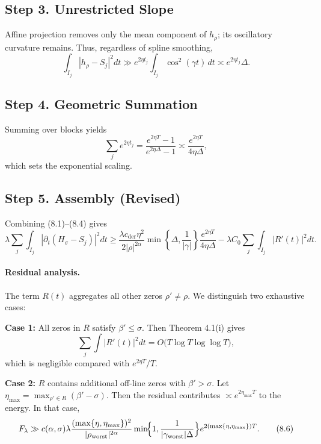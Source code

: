 \subsection{Step 3.  Unrestricted Slope}

Affine projection removes only the mean component of $h_\rho$; its
oscillatory curvature remains.  
Thus, regardless of spline smoothing,
\[
\int_{I_j}\!|h_\rho-S_j|^2dt
   \gg e^{2\eta t_j}\!\int_{I_j}\!\cos^2(\gamma t)\,dt
   \asymp e^{2\eta t_j}\Delta.
\tag{8.3}
\]

\subsection{Step 4.  Geometric Summation}

Summing over blocks yields
\[
\sum_j e^{2\eta t_j}
  = \frac{e^{2\eta T}-1}{e^{2\eta\Delta}-1}
  \asymp \frac{e^{2\eta T}}{4\eta\Delta},
\tag{8.4}
\]
which sets the exponential scaling.

\subsection{Step 5.  Assembly (Revised)}

Combining (8.1)–(8.4) gives
\[
\lambda\sum_j\!\int_{I_j}\!|\partial_t(H_\sigma-S_j)|^2dt
 \ge
\frac{\lambda c_{\mathrm{der}}\eta^2}{2|\rho|^{2\alpha}}
 \min\!\left\{\!\Delta,\frac{1}{|\gamma|}\!\right\}
 \frac{e^{2\eta T}}{4\eta\Delta}
 - \lambda C_0\!\sum_j\!\int_{I_j}\!|R'(t)|^2dt.
\tag{8.5}
\]

\paragraph{Residual analysis.}
The term $R(t)$ aggregates all other zeros $\rho'\neq\rho$.
We distinguish two exhaustive cases:

\medskip
\noindent
\textbf{Case 1:} 
All zeros in $R$ satisfy $\beta'\le\sigma$.  
Then Theorem 4.1(i) gives
\[
\sum_j\!\int |R'(t)|^2dt
  =O\!\bigl(T\log T\log\log T\bigr),
\]
which is negligible compared with $e^{2\eta T}/T$.

\medskip
\noindent
\textbf{Case 2:}
$R$ contains additional off-line zeros with $\beta'>\sigma$.
Let $\eta_{\max}=\max_{\rho'\in R}(\beta'-\sigma)$.
Then the residual contributes $\asymp e^{2\eta_{\max}T}$ to the energy.
In that case,
\[
F_\lambda
 \gg
 c(\alpha,\sigma)\lambda
 \frac{(\max\{\eta,\eta_{\max}\})^2}{|\rho_{\mathrm{worst}}|^{2\alpha}}
 \min\!\Bigl\{1,\frac{1}{|\gamma_{\mathrm{worst}}|\Delta}\Bigr\}
 e^{2(\max\{\eta,\eta_{\max}\})T}.
\tag{8.6}
\]

